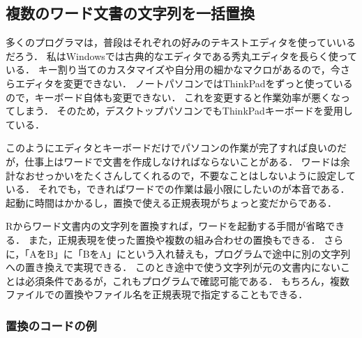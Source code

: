 \documentclass[
]{article}
\begin{document}
\hypertarget{ux8907ux6570ux306eux30efux30fcux30c9ux6587ux66f8ux306eux6587ux5b57ux5217ux3092ux4e00ux62ecux7f6eux63db}{%
\subsection{複数のワード文書の文字列を一括置換}\label{ux8907ux6570ux306eux30efux30fcux30c9ux6587ux66f8ux306eux6587ux5b57ux5217ux3092ux4e00ux62ecux7f6eux63db}}

多くのプログラマは，普段はそれぞれの好みのテキストエディタを使っていいるだろう．
私はWindowsでは古典的なエディタである秀丸エディタを長らく使っている．
キー割り当てのカスタマイズや自分用の細かなマクロがあるので，今さらエディタを変更できない．
ノートパソコンではThinkPadをずっと使っているので，キーボード自体も変更できない．
これを変更すると作業効率が悪くなってしまう．
そのため，デスクトップパソコンでもThinkPadキーボードを愛用している．

このようにエディタとキーボードだけでパソコンの作業が完了すれば良いのだが，仕事上はワードで文書を作成しなければならないことがある．
ワードは余計なおせっかいをたくさんしてくれるので，不要なことはしないように設定している．
それでも，できればワードでの作業は最小限にしたいのが本音である．
起動に時間はかかるし，置換で使える正規表現がちょっと変だからである．

Rからワード文書内の文字列を置換すれば，ワードを起動する手間が省略できる．
また，正規表現を使った置換や複数の組み合わせの置換もできる．
さらに，「AをB」に「BをA」にという入れ替えも，プログラムで途中に別の文字列への置き換えで実現できる．
このとき途中で使う文字列が元の文書内にないことは必須条件であるが，これもプログラムで確認可能である．
もちろん，複数ファイルでの置換やファイル名を正規表現で指定することもできる．

\hypertarget{ux7f6eux63dbux306eux30b3ux30fcux30c9ux306eux4f8b}{%
\subsubsection{置換のコードの例}\label{ux7f6eux63dbux306eux30b3ux30fcux30c9ux306eux4f8b}}
\end{document}
